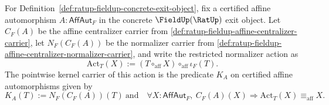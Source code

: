 \begin{definition}
\label{def:ratup-fieldup-affine-normalizer-action-kernel-carrier}
For Definition~\ref{def:ratup-fieldup-concrete-exit-object}, fix a certified
affine automorphism $A:\mathsf{AffAut}_F$ in the concrete $\FieldUp(\RatUp)$
exit object. Let $C_F(A)$ be the affine centralizer carrier from
\autoref{def:ratup-fieldup-affine-centralizer-carrier}, let $N_F(C_F(A))$ be
the normalizer carrier from
\autoref{def:ratup-fieldup-affine-centralizer-normalizer-carrier}, and write
the restricted normalizer action as
$$
\mathrm{Act}_T(X):=(T\circ_{\mathrm{aff}}X)\circ_{\mathrm{aff}}\iota_F(T).
$$
The pointwise kernel carrier of this action is the predicate $K_A$ on certified
affine automorphisms given by
$$
K_A(T):=N_F(C_F(A))(T)\ \text{and}\quad
\forall X:\mathsf{AffAut}_F,\ C_F(A)(X)\Rightarrow
\mathrm{Act}_T(X)\equiv_{\mathrm{aff}}X.
$$
\end{definition}

